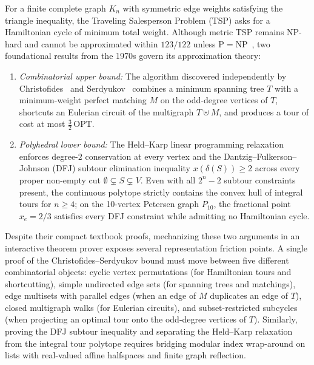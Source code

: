For a finite complete graph $K_n$ with symmetric edge weights satisfying the triangle inequality, the Traveling Salesperson Problem (TSP) asks for a Hamiltonian cycle of minimum total weight. Although metric TSP remains NP-hard and cannot be approximated within $123/122$ unless $\mathrm{P}=\mathrm{NP}$~\cite{karp1972,applegate2006}, two foundational results from the 1970s govern its approximation theory:
\begin{enumerate}
  \item \emph{Combinatorial upper bound:} The algorithm discovered independently by Christofides~\cite{christofides1976} and Serdyukov~\cite{serdyukov1978} combines a minimum spanning tree $T$ with a minimum-weight perfect matching $M$ on the odd-degree vertices of $T$, shortcuts an Eulerian circuit of the multigraph $T \uplus M$, and produces a tour of cost at most $\frac{3}{2}\,\mathrm{OPT}$.
  \item \emph{Polyhedral lower bound:} The Held--Karp linear programming relaxation~\cite{dfj1954,hk1970} enforces degree-$2$ conservation at every vertex and the Dantzig--Fulkerson--Johnson (DFJ) subtour elimination inequality $x(\delta(S)) \ge 2$ across every proper non-empty cut $\emptyset \subsetneq S \subsetneq V$. Even with all $2^n - 2$ subtour constraints present, the continuous polytope strictly contains the convex hull of integral tours for $n \ge 4$; on the 10-vertex Petersen graph $P_{10}$, the fractional point $x_e = 2/3$ satisfies every DFJ constraint while admitting no Hamiltonian cycle.
\end{enumerate}

Despite their compact textbook proofs, mechanizing these two arguments in an interactive theorem prover exposes several representation friction points. A single proof of the Christofides--Serdyukov bound must move between five different combinatorial objects: cyclic vertex permutations (for Hamiltonian tours and shortcutting), simple undirected edge sets (for spanning trees and matchings), edge multisets with parallel edges (when an edge of $M$ duplicates an edge of $T$), closed multigraph walks (for Eulerian circuits), and subset-restricted subcycles (when projecting an optimal tour onto the odd-degree vertices of $T$). Similarly, proving the DFJ subtour inequality and separating the Held--Karp relaxation from the integral tour polytope requires bridging modular index wrap-around on lists with real-valued affine halfspaces and finite graph reflection.

